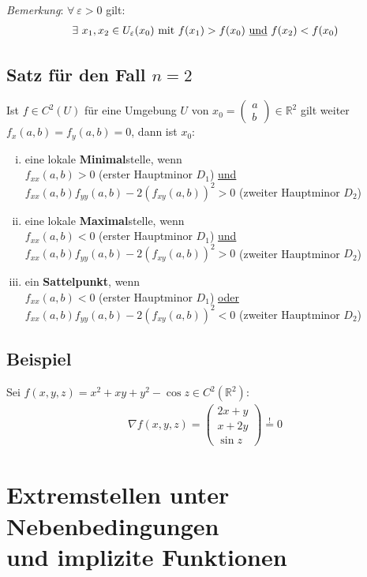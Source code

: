 \documentclass[11pt,a4paper]{book}
\newcommand {\R}	{\mathbb{R}}
\newcommand{\1}    	{\mathbbm{1}}
\newcommand{\mitt}	{\textrm{ mit }}
\newcommand{\Bemerkung}	{\noindent\textit{Bemerkung}: }
\begin{document}
\Bemerkung \(\forall~ \varepsilon > 0\) gilt:
\begin{align*}
	\exists~ x_1, x_2 \in U_\varepsilon(x_0) \mitt f(x_1) > f(x_0) \textrm{ \underline{und} } f(x_2) < f(x_0)
\end{align*}

\subsection{Satz für den Fall \(n=2\)}
Ist \(f\in C^2(U)\) für eine Umgebung \(U\) von \(x_0 = \left(\begin{array}{c}
	a \\ b
\end{array}\right)\in\R^2\) gilt weiter \(f_x(a,b)=f_y(a,b)=0\), dann ist \(x_0\):
\begin{enumerate}[(i)]
	\item eine lokale \textbf{Minimal}stelle, wenn \\
	\(f_{xx}(a,b) > 0\) (erster Hauptminor \(D_1\)) \underline{und}\\
	 \(f_{xx}(a,b) f_{yy}(a,b) - 2(f_{xy}(a,b))^2 > 0\) (zweiter Hauptminor \(D_2\))
	\item eine lokale \textbf{Maximal}stelle, wenn \\
	\(f_{xx}(a,b) < 0\) (erster Hauptminor \(D_1\)) \underline{und}\\
	 \(f_{xx}(a,b) f_{yy}(a,b) - 2(f_{xy}(a,b))^2 > 0\) (zweiter Hauptminor \(D_2\))
	 \item ein \textbf{Sattelpunkt}, wenn \\
	\(f_{xx}(a,b) < 0\) (erster Hauptminor \(D_1\)) \underline{oder}\\
	 \(f_{xx}(a,b) f_{yy}(a,b) - 2(f_{xy}(a,b))^2 < 0\) (zweiter Hauptminor \(D_2\))
\end{enumerate}

\subsection{Beispiel}
Sei \(f(x,y,z) = x^2 + xy + y^2 - \cos z \in C^2(\R^2)\):
\begin{align*}
	\nabla f(x,y,z) = \left( \begin{array}{c}
		2x + y \\
		x + 2y \\
		\sin z
	\end{array} \right) \stackrel{!}{=} 0
\end{align*}

\section{Extremstellen unter Nebenbedingungen\\
und implizite Funktionen}
\end{document}
